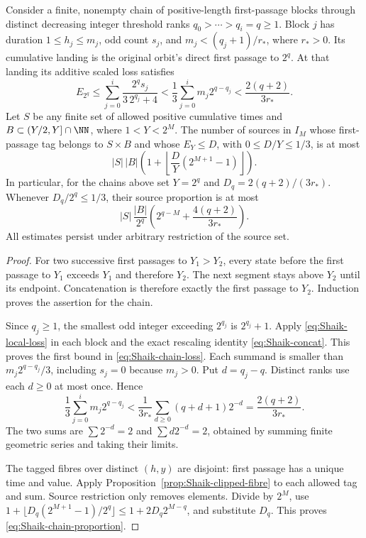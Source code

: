 \begin{proposition}
\label{prop:Shaik-chain-transport}
Consider a finite, nonempty chain of positive-length first-passage
blocks through distinct decreasing integer threshold ranks
\(q_0>\cdots>q_i=q\ge1\). Block \(j\) has duration
\(1\le h_j\le m_j\), odd count \(s_j\), and
\(m_j<(q_j+1)/r_*\), where \(r_*>0\).
Its cumulative landing is the original orbit's direct first passage
to \(2^q\). At that landing its additive scaled loss satisfies
\begin{equation}\label{eq:Shaik-chain-loss}
 E_{2^q}\le
 \sum_{j=0}^i\frac{2^q s_j}{3\,2^{q_j}+4}
 <\frac13\sum_{j=0}^i m_j2^{q-q_j}
 <\frac{2(q+2)}{3r_*}.
\end{equation}
Let \(S\) be any finite set of allowed positive cumulative times and
\(B\subset(Y/2,Y]\cap\NN\), where \(1<Y<2^M\). The number of
sources in \(I_M\) whose first-passage tag belongs to \(S\times B\)
and whose \(E_Y\le D\), with \(0\le D/Y\le1/3\), is at most
\begin{equation}\label{eq:Shaik-transport}
 |S|\,|B|\left(1+
       \left\lfloor\frac D Y(2^{M+1}-1)\right\rfloor\right).
\end{equation}
In particular, for the chains above set \(Y=2^q\) and
\(D_q=2(q+2)/(3r_*)\). Whenever \(D_q/2^q\le1/3\), their
source proportion is at most
\begin{equation}\label{eq:Shaik-chain-proportion}
 |S|\,\frac{|B|}{2^q}
       \left(2^{q-M}+\frac{4(q+2)}{3r_*}\right).
\end{equation}
All estimates persist under arbitrary restriction of the source set.
\end{proposition}
\begin{proof}
For two successive first passages to \(Y_1>Y_2\), every state before
the first passage to \(Y_1\) exceeds \(Y_1\) and therefore \(Y_2\).
The next segment stays above \(Y_2\) until its endpoint.
Concatenation is therefore exactly the first passage to \(Y_2\).
Induction proves the assertion for the chain.

Since \(q_j\ge1\), the smallest odd integer exceeding \(2^{q_j}\)
is \(2^{q_j}+1\). Apply \eqref{eq:Shaik-local-loss} in each block
and the exact rescaling identity \eqref{eq:Shaik-concat}.
This proves the first bound in \eqref{eq:Shaik-chain-loss}.
Each summand is smaller than \(m_j2^{q-q_j}/3\), including
\(s_j=0\) because \(m_j>0\). Put \(d=q_j-q\).
Distinct ranks use each \(d\ge0\) at most once. Hence
\[
 \frac13\sum_{j=0}^i m_j2^{q-q_j}
 <\frac1{3r_*}\sum_{d\ge0}(q+d+1)2^{-d}
 =\frac{2(q+2)}{3r_*}.
\]
The two sums are \(\sum 2^{-d}=2\) and \(\sum d2^{-d}=2\),
obtained by summing finite geometric series and taking their limits.

The tagged fibres over distinct \((h,y)\) are disjoint: first passage
has a unique time and value. Apply
Proposition~\ref{prop:Shaik-clipped-fibre} to each allowed tag and sum.
Source restriction only removes elements. Divide by \(2^M\), use
\(1+\lfloor D_q(2^{M+1}-1)/2^q\rfloor
 \le1+2D_q2^{M-q}\), and substitute \(D_q\).
This proves \eqref{eq:Shaik-chain-proportion}.
\end{proof}

